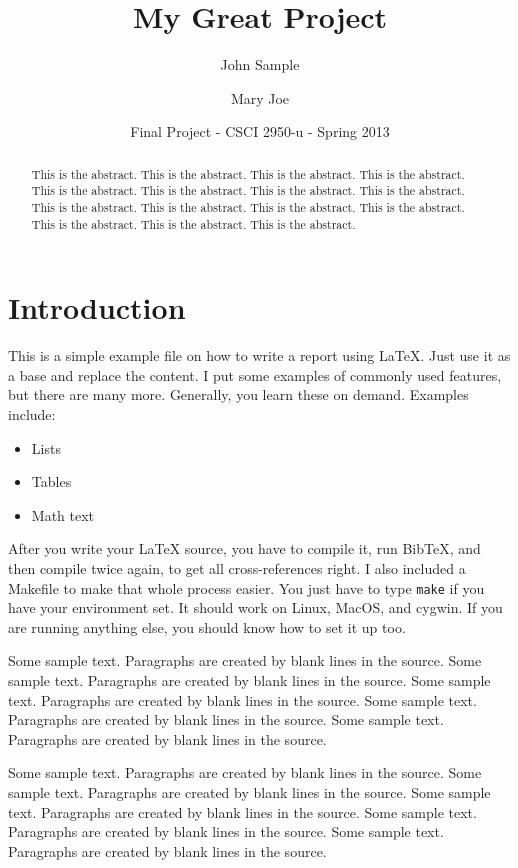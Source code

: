 \documentclass[11pt]{article}
\begin{document}
\title{My Great Project}
\author{John Sample \and Mary Joe}
\date{Final Project - CSCI 2950-u - Spring 2013}
\maketitle

\begin{abstract}
This is the abstract. This is the abstract. This is the abstract. 
This is the abstract. This is the abstract. This is the abstract. 
This is the abstract. This is the abstract. This is the abstract. 
This is the abstract. This is the abstract. This is the abstract. 
This is the abstract. This is the abstract. This is the abstract. 
\end{abstract}

\section{Introduction}
\label{sec:intro}
This is a simple example file on how to write a report using LaTeX.
Just use it as a base and replace the content. I put some examples of
commonly used features, but there are many more. Generally, you learn
these on demand. Examples include:

\begin{itemize}
\item Lists
\item Tables
\item Math text
\end{itemize}

After you write your LaTeX source, you have to compile it, run
BibTeX, and then compile twice again, to get all cross-references 
right. I also included a Makefile to make that whole process easier.
You just have to type \texttt{make} if you have your environment set.
It should work on Linux, MacOS, and cygwin. If you are running 
anything else, you should know how to set it up too.

Some sample text. Paragraphs are created by blank lines in the source.
Some sample text. Paragraphs are created by blank lines in the source.
Some sample text. Paragraphs are created by blank lines in the source.
Some sample text. Paragraphs are created by blank lines in the source.
Some sample text. Paragraphs are created by blank lines in the source.

Some sample text. Paragraphs are created by blank lines in the source.
Some sample text. Paragraphs are created by blank lines in the source.
Some sample text. Paragraphs are created by blank lines in the source.
Some sample text. Paragraphs are created by blank lines in the source.
Some sample text. Paragraphs are created by blank lines in the source.
\end{document}
